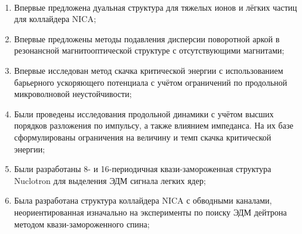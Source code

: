 ~\\
\par {\novelty}
\begin{enumerate}[beginpenalty=10000] %
	\item	Впервые предложена дуальная структура для тяжелых ионов и лёгких частиц для коллайдера NICA;
	\item 	Впервые предложены методы подавления дисперсии поворотной аркой в резонансной магнитооптической структуре с отсутствующими магнитами;
	\item 	Впервые исследован метод скачка критической энергии с использованием барьерного ускоряющего потенциала с учётом ограничений по продольной микроволновой неустойчивости;
	\item	Были проведены исследования продольной динамики с учётом высших порядков разложения по импульсу, а также влиянием импеданса. На их базе сформулированы ограничения на величину и темп скачка критической энергии;
	\item	Были разработаны 8- и 16-периодичная квази-замороженная структура Nuclotron для выделения ЭДМ сигнала легких ядер;
	\item	Была разработана структура коллайдера NICA с обводными каналами, неориентированная изначально на эксперименты по поиску ЭДМ дейтрона методом квази-замороженного спина;
\end{enumerate}
